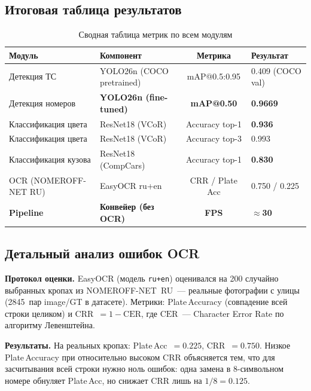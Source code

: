 \documentclass[10pt,a4paper]{report}
\numberwithin{equation}{chapter}
\numberwithin{figure}{chapter}
\numberwithin{table}{chapter}
\begin{document}
\subsection{Итоговая таблица результатов}

\begin{table}[H]
\centering
\caption{Сводная таблица метрик по всем модулям}
\label{tab:final_summary}
\begin{tabularx}{\textwidth}{lXcX}
\toprule
\textbf{Модуль} & \textbf{Компонент} & \textbf{Метрика} & \textbf{Результат} \\
\midrule
Детекция ТС         & YOLO26n (COCO pretrained)  & mAP@0.5:0.95   & 0.409 (COCO val) \\
Детекция номеров    & \textbf{YOLO26n (fine-tuned)} & \textbf{mAP@0.50} & \textbf{0.9669} \\
Классификация цвета & ResNet18 (VCoR)            & Accuracy top-1 & \textbf{0.936} \\
Классификация цвета & ResNet18 (VCoR)            & Accuracy top-3 & 0.993 \\
Классификация кузова& ResNet18 (CompCars)        & Accuracy top-1 & \textbf{0.830} \\
OCR (NOMEROFF-NET RU) & EasyOCR ru+en           & CRR / Plate Acc & 0.750 / 0.225 \\
\textbf{Pipeline}   & \textbf{Конвейер (без OCR)} & \textbf{FPS}  & $\approx$\textbf{30} \\
\bottomrule
\end{tabularx}
\end{table}

\subsection{Детальный анализ ошибок OCR}
\label{subsec:ocr_errors}

\textbf{Протокол оценки.}
EasyOCR (модель \texttt{ru+en}) оценивался на 200 случайно выбранных
кропах из NOMEROFF-NET~RU~--- реальные фотографии с улицы
(2845~пар image/GT в датасете).
Метрики: Plate\,Accuracy (совпадение всей строки целиком) и
CRR~$=1-\mathrm{CER}$, где $\mathrm{CER}$~--- Character Error Rate
по алгоритму Левенштейна.

\textbf{Результаты.}
На реальных кропах: Plate\,Acc~$=0.225$, CRR~$=0.750$.
Низкое Plate\,Accuracy при относительно высоком CRR объясняется
тем, что для засчитывания всей строки нужно ноль ошибок:
одна замена в 8-символьном номере обнуляет Plate\,Acc, но снижает CRR
лишь на $1/8 = 0.125$.
\end{document}
